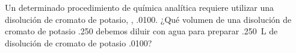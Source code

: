 Un determinado procedimiento de química analítica requiere utilizar una disolución de cromato de potasio, , \SI{,0100}{\Molar}. ¿Qué volumen de una disolución de cromato de potasio \SI{,250}{\Molar} debemos diluir con agua para preparar \SI{,250}{\liter} de disolución de cromato de potasio \SI{,0100}{\Molar}?

